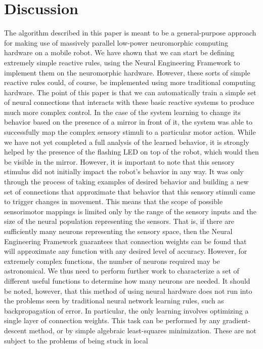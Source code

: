 \documentclass[conference]{IEEEtran}
\begin{document}
\section{Discussion}
The algorithm described in this paper is meant to be a
general-purpose approach for making use of massively
parallel low-power neuromorphic computing hardware on a
mobile robot. We have shown that we can start be defining
extremely simple reactive rules, using the Neural
Engineering Framework to implement them on the
neuromorphic hardware. However, these sorts of simple
reactive rules could, of course, be implemented using more
traditional computing hardware. The point of this paper is
that we can automatically train a simple set of neural
connections that interacts with these basic reactive systems
to produce much more complex control.
In the case of the system learning to change its behavior
based on the presence of a mirror in front of it, the system
was able to successfully map the complex sensory stimuli to
a particular motor action. While we have not yet completed
a full analysis of the learned behavior, it is strongly helped
by the presence of the flashing LED on top of the robot,
which would then be visible in the mirror. However, it is
important to note that this sensory stimulus did not initially
impact the robot's behavior in any way. It was only through
the process of taking examples of desired behavior and
building a new set of connections that approximate that
behavior that this sensory stimuli came to trigger changes in
movement.
This means that the scope of possible sensorimotor
mappings is limited only by the range of the sensory inputs
and the size of the neural population representing the
sensors. That is, if there are sufficiently many neurons
representing the sensory space, then the Neural Engineering
Framework guarantees that connection weights can be
found that will approximate any function with any desired
level of accuracy. However, for extremely complex
functions, the number of neurons required may be
astronomical. We thus need to perform further work to
characterize a set of different useful functions to determine
how many neurons are needed.
It should be noted, however, that this method of using
neural hardware does not run into the problems seen by
traditional neural network learning rules, such as backpropagation
of error. In particular, the only learning
involves optimizing a single layer of connection weights.
This task can be performed by any gradient-descent method,
or by simple algebraic least-squares minimization. These
are not subject to the problems of being stuck in local
\end{document}
